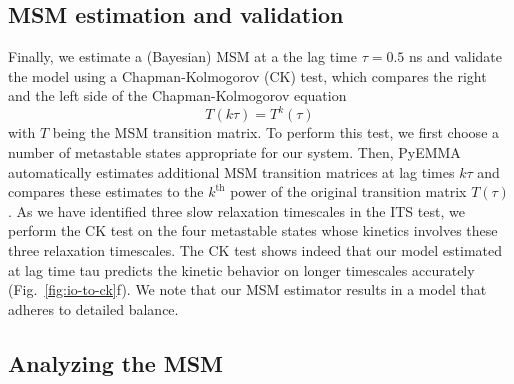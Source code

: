 \documentclass[9pt,tutorial]{livecoms}
\begin{document}
\subsection{MSM estimation and validation}

Finally, we estimate a (Bayesian) MSM at a the lag time $\tau=0.5$ ns and validate the model using a Chapman-Kolmogorov (CK) test, which compares the right and the left side of the Chapman-Kolmogorov equation
\begin{equation}
\label{eq:ck}
T(k \tau) = T^k(\tau)
\end{equation}
with $T$ being the MSM transition matrix.
To perform this test, we first choose a number of metastable states appropriate for our system. Then, PyEMMA automatically estimates additional MSM transition matrices at lag times $k \tau$ and compares these estimates to the $k^\textrm{th}$ power of the original transition matrix $T(\tau)$.
As we have identified three slow relaxation timescales in the ITS test,
we perform the CK test on the four metastable states whose kinetics involves these three relaxation timescales.
The CK test shows indeed that our model estimated at lag time tau predicts the kinetic behavior on longer timescales accurately (Fig.~\ref{fig:io-to-ck}f).
We note that our MSM estimator results in a model that adheres to detailed balance.

\subsection{Analyzing the MSM}
\end{document}
